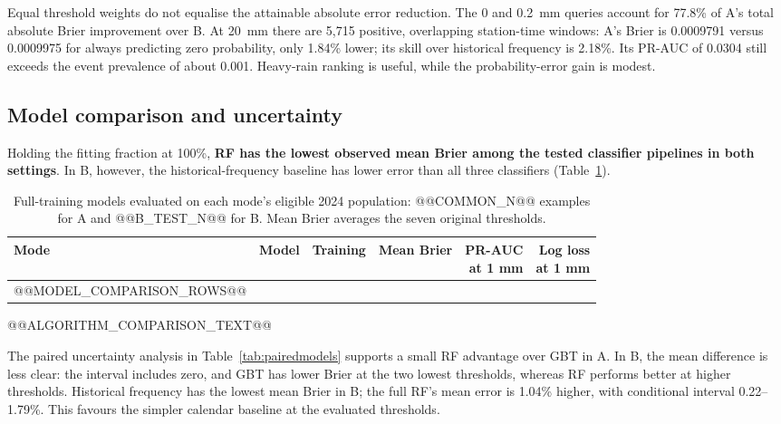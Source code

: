 Equal threshold weights do not equalise the attainable absolute error reduction. The 0 and 0.2~mm queries account for 77.8\% of A's total absolute Brier improvement over B. At 20~mm there are 5,715 positive, overlapping station-time windows: A's Brier is 0.0009791 versus 0.0009975 for always predicting zero probability, only 1.84\% lower; its skill over historical frequency is 2.18\%. Its PR-AUC of 0.0304 still exceeds the event prevalence of about 0.001. Heavy-rain ranking is useful, while the probability-error gain is modest.

\FloatBarrier
\subsection{Model comparison and uncertainty}
Holding the fitting fraction at 100\%, \textbf{RF has the lowest observed mean Brier among the tested classifier pipelines in both settings}. In B, however, the historical-frequency baseline has lower error than all three classifiers (Table~\ref{tab:t2baseline}).
\par
\begin{table}[!ht]\centering\small
\begin{tabular}{llrrrr}\toprule
Mode & Model & Training & Mean Brier & \shortstack{PR-AUC\\at 1 mm} & \shortstack{Log loss\\at 1 mm}\\\midrule
@@MODEL_COMPARISON_ROWS@@
\bottomrule
\end{tabular}
\caption{Full-training models evaluated on each mode's eligible 2024 population: @@COMMON_N@@ examples for A and @@B_TEST_N@@ for B. Mean Brier averages the seven original thresholds.}\label{tab:t2baseline}
\end{table}
\par
@@ALGORITHM_COMPARISON_TEXT@@

The paired uncertainty analysis in Table~\ref{tab:pairedmodels} supports a small RF advantage over GBT in A. In B, the mean difference is less clear: the interval includes zero, and GBT has lower Brier at the two lowest thresholds, whereas RF performs better at higher thresholds. Historical frequency has the lowest mean Brier in B; the full RF's mean error is 1.04\% higher, with conditional interval 0.22--1.79\%. This favours the simpler calendar baseline at the evaluated thresholds.

